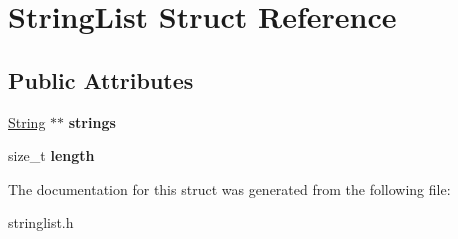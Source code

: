 \hypertarget{structStringList}{}\section{String\+List Struct Reference}
\label{structStringList}
\subsection*{Public Attributes}
\begin{DoxyCompactItemize}
\item 
\hypertarget{structStringList_a277bc0217be707887bfed39407bf043c}{}\hyperlink{structString}{String} $\ast$$\ast$ {\bfseries strings}\label{structStringList_a277bc0217be707887bfed39407bf043c}

\item 
\hypertarget{structStringList_a99130bfd669df8116c60e63535ee8617}{}size\+\_\+t {\bfseries length}\label{structStringList_a99130bfd669df8116c60e63535ee8617}

\end{DoxyCompactItemize}


The documentation for this struct was generated from the following file\+:\begin{DoxyCompactItemize}
\item 
stringlist.\+h\end{DoxyCompactItemize}
